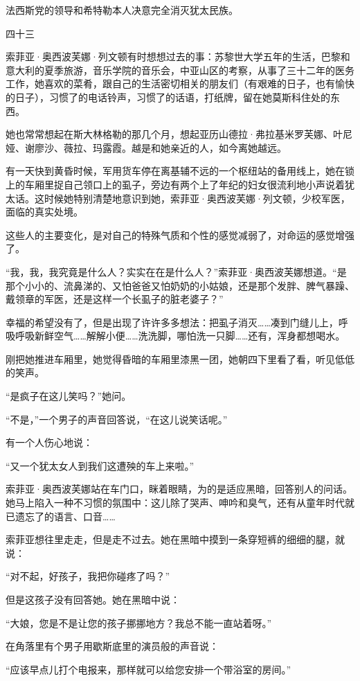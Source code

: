 法西斯党的领导和希特勒本人决意完全消灭犹太民族。

四十三

索菲亚·奥西波芙娜·列文顿有时想想过去的事：苏黎世大学五年的生活，巴黎和意大利的夏季旅游，音乐学院的音乐会，中亚山区的考察，从事了三十二年的医务工作，她喜欢的菜肴，跟自己的生活密切相关的朋友们（有艰难的日子，也有愉快的日子），习惯了的电话铃声，习惯了的话语，打纸牌，留在她莫斯科住处的东西。

她也常常想起在斯大林格勒的那几个月，想起亚历山德拉·弗拉基米罗芙娜、叶尼娅、谢廖沙、薇拉、玛露霞。越是和她亲近的人，如今离她越远。

有一天快到黄昏时候，军用货车停在离基辅不远的一个枢纽站的备用线上，她在锁上的车厢里捉自己领口上的虱子，旁边有两个上了年纪的妇女很流利地小声说着犹太话。这时候她特别清楚地意识到她，索菲亚·奥西波芙娜·列文顿，少校军医，面临的真实处境。

这些人的主要变化，是对自己的特殊气质和个性的感觉减弱了，对命运的感觉增强了。

“我，我，我究竟是什么人？实实在在是什么人？”索菲亚·奥西波芙娜想道。“是那个小小的、流鼻涕的、又怕爸爸又怕奶奶的小姑娘，还是那个发胖、脾气暴躁、戴领章的军医，还是这样一个长虱子的脏老婆子？”

幸福的希望没有了，但是出现了许许多多想法：把虱子消灭……凑到门缝儿上，呼吸呼吸新鲜空气……解解小便……洗洗脚，哪怕洗一只脚……还有，浑身都想喝水。

刚把她推进车厢里，她觉得昏暗的车厢里漆黑一团，她朝四下里看了看，听见低低的笑声。

“是疯子在这儿笑吗？”她问。

“不是，”一个男子的声音回答说，“在这儿说笑话呢。”

有一个人伤心地说：

“又一个犹太女人到我们这遭殃的车上来啦。”

索菲亚·奥西波芙娜站在车门口，眯着眼睛，为的是适应黑暗，回答别人的问话。她马上陷入一种不习惯的氛围中：这儿除了哭声、呻吟和臭气，还有从童年时代就已遗忘了的语言、口音……

索菲亚想往里走走，但是走不过去。她在黑暗中摸到一条穿短裤的细细的腿，就说：

“对不起，好孩子，我把你碰疼了吗？”

但是这孩子没有回答她。她在黑暗中说：

“大娘，您是不是让您的孩子挪挪地方？我总不能一直站着呀。”

在角落里有个男子用歇斯底里的演员般的声音说：

“应该早点儿打个电报来，那样就可以给您安排一个带浴室的房间。”

